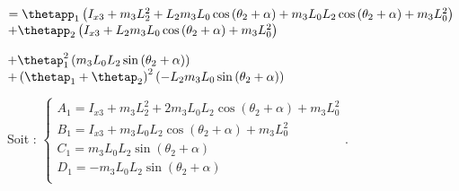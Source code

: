 \begin{corrige}
%
%
% 


$= 
\thetapp_1\left(I_{x3} + m_3 L_2^2 +L_2  m_3 L_0   \cos\left( \theta_2+\alpha\right) +  m_3 L_0 L_2  \cos\left( \theta_2+\alpha \right) +   m_3 L_0^2 \right)$
$+\thetapp_2\left(I_{x3} +L_2  m_3 L_0  \cos\left( \theta_2+\alpha\right) +   m_3 L_0^2 \right)$

$+\thetap_1^2\left( m_3 L_0 L_2 \sin\left( \theta_2+\alpha\right)\right)$
$+\left(\thetap_1 + \thetap_2 \right)^2\left(-L_2  m_3 L_0  \sin\left( \theta_2+\alpha\right) \right) $


Soit : $ \left\{ \begin{array}{l}
A_1 = I_{x3} + m_3 L_2^2 + 2 m_3 L_0 L_2 \cos\left( \theta_2+\alpha\right) +   m_3 L_0^2  \\
B_1 = I_{x3} + m_3 L_0 L_2 \cos\left( \theta_2+\alpha\right) +   m_3 L_0^2  \\
C_1 = m_3 L_0 L_2 \sin\left( \theta_2+\alpha\right) \\
D_1 =-m_3 L_0L_2    \sin\left( \theta_2+\alpha\right)  \\
\end{array}\right.
$.
\end{corrige}\else\fi

